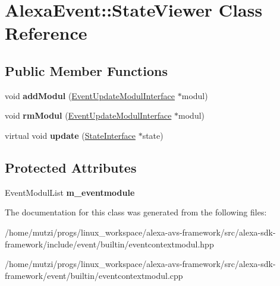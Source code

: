\hypertarget{classAlexaEvent_1_1StateViewer}{}\section{Alexa\+Event\+:\+:State\+Viewer Class Reference}
\label{classAlexaEvent_1_1StateViewer}
\subsection*{Public Member Functions}
\begin{DoxyCompactItemize}
\item 
\mbox{\label{classAlexaEvent_1_1StateViewer_acc505619e3f36d67adbfdda2c035574f}} 
void {\bfseries add\+Modul} (\hyperlink{classAlexaEvent_1_1EventUpdateModulInterface}{Event\+Update\+Modul\+Interface} $\ast$modul)
\item 
\mbox{\label{classAlexaEvent_1_1StateViewer_abcb2f7c3494fb4f28206b60050f49c73}} 
void {\bfseries rm\+Modul} (\hyperlink{classAlexaEvent_1_1EventUpdateModulInterface}{Event\+Update\+Modul\+Interface} $\ast$modul)
\item 
\mbox{\label{classAlexaEvent_1_1StateViewer_af1cda5b0bb54ca6060d8357222938a22}} 
virtual void {\bfseries update} (\hyperlink{classAlexaEvent_1_1StateInterface}{State\+Interface} $\ast$state)
\end{DoxyCompactItemize}
\subsection*{Protected Attributes}
\begin{DoxyCompactItemize}
\item 
\mbox{\label{classAlexaEvent_1_1StateViewer_a2a243a3eafde9de06e230e8e7622c0f3}} 
Event\+Modul\+List {\bfseries m\+\_\+eventmodule}
\end{DoxyCompactItemize}


The documentation for this class was generated from the following files\+:\begin{DoxyCompactItemize}
\item 
/home/mutzi/progs/linux\+\_\+workspace/alexa-\/avs-\/framework/src/alexa-\/sdk-\/framework/include/event/builtin/eventcontextmodul.\+hpp\item 
/home/mutzi/progs/linux\+\_\+workspace/alexa-\/avs-\/framework/src/alexa-\/sdk-\/framework/event/builtin/eventcontextmodul.\+cpp\end{DoxyCompactItemize}
